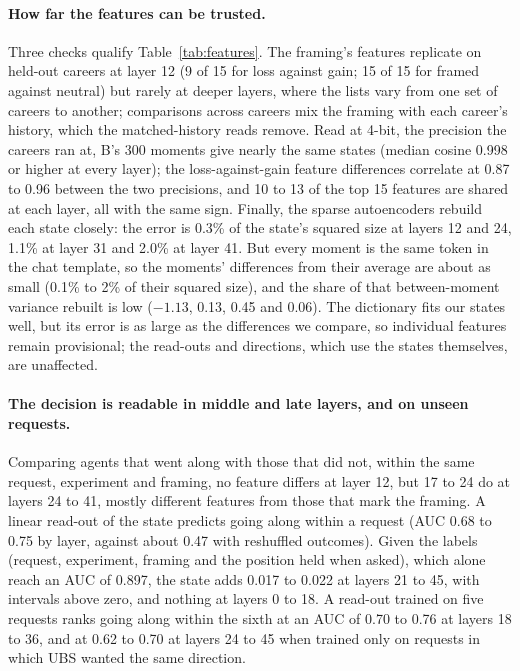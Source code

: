 \documentclass[11pt]{article}
\begin{document}
\paragraph{How far the features can be trusted.} Three checks qualify Table~\ref{tab:features}. The framing's
features replicate on held-out careers at layer 12 (9 of 15 for loss against gain; 15 of 15 for framed against neutral)
but rarely at deeper layers, where the lists vary from one set of careers to another; comparisons across careers mix
the framing with each career's history, which the matched-history reads remove. Read at 4-bit, the precision the careers
ran at, B's 300 moments give nearly the same states (median cosine 0.998 or higher at every layer); the loss-against-gain
feature differences correlate at 0.87 to 0.96 between the two precisions, and 10 to 13 of the top 15 features are shared at
each layer, all with the same sign. Finally, the sparse autoencoders rebuild each state closely: the error is 0.3\% of the
state's squared size at layers 12 and 24, 1.1\% at layer 31 and 2.0\% at layer 41. But every moment is the same token in
the chat template, so the moments' differences from their average are about as small (0.1\% to 2\% of their squared size),
and the share of that between-moment variance rebuilt is low ($-1.13$, 0.13, 0.45 and 0.06). The dictionary fits our states
well, but its error is as large as the differences we compare, so individual features remain provisional; the read-outs
and directions, which use the states themselves, are unaffected.

\paragraph{The decision is readable in middle and late layers, and on unseen requests.} Comparing agents that went along
with those that did not, within the same request, experiment and framing, no feature differs at layer 12, but 17 to 24
do at layers 24 to 41, mostly different features from those that mark the framing. A linear read-out of the state
predicts going along within a request (AUC 0.68 to 0.75 by layer, against about 0.47 with reshuffled outcomes). Given
the labels (request, experiment, framing and the position held when asked), which alone reach an AUC of 0.897, the state
adds 0.017 to 0.022 at layers 21 to 45, with intervals above zero, and nothing at layers 0 to 18. A read-out trained on
five requests ranks going along within the sixth at an AUC of 0.70 to 0.76 at layers 18 to 36, and at 0.62 to 0.70 at
layers 24 to 45 when trained only on requests in which UBS wanted the same direction.
\end{document}
